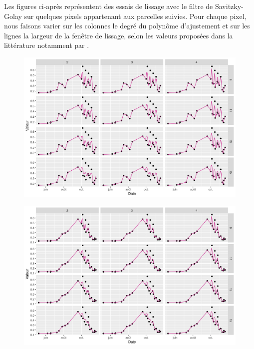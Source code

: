 Les figures ci-après représentent des essais de lissage avec le filtre de Savitzky-Golay sur quelques pixels appartenant aux parcelles suivies. Pour chaque pixel, nous faisons varier sur les colonnes le degré du polynôme d'ajustement et sur les lignes la largeur de la fenêtre de lissage, selon les valeurs proposées dans la littérature notamment par \citet{Chen2004}. 

\vspace{5mm}

\begin{figure}[htbp]
 \begin{center}
  \includegraphics[scale=0.7]{annexes/savgol_prs_1.png} 
 \end{center}
\end{figure}

\begin{figure}[htbp]
 \begin{center}
  \includegraphics[scale=0.7]{annexes/savgol_prs_2.png} 
 \end{center}
\end{figure}

